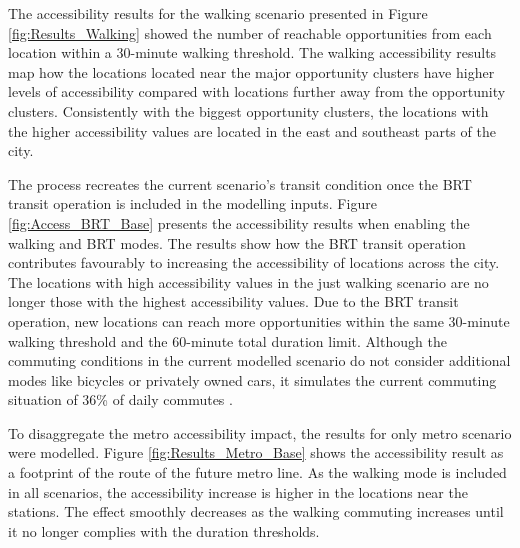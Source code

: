 \documentclass[12pt, a4paper]{report}
\begin{document}
The accessibility results for the walking scenario presented in Figure \ref{fig:Results_Walking} showed the number of reachable opportunities from each location within a 30-minute walking threshold. The walking accessibility results map how the locations located near the major opportunity clusters have higher levels of accessibility compared with locations further away from the opportunity clusters. Consistently with the biggest opportunity clusters, the locations with the higher accessibility values are located in the east and southeast parts of the city.

The process recreates the current scenario's transit condition once the BRT transit operation is included in the modelling inputs. Figure \ref{fig:Access_BRT_Base} presents the accessibility results when enabling the walking and BRT modes. The results show how the BRT transit operation contributes favourably to increasing the accessibility of locations across the city. The locations with high accessibility values in the just walking scenario are no longer those with the highest accessibility values. Due to the BRT transit operation, new locations can reach more opportunities within the same 30-minute walking threshold and the 60-minute total duration limit. Although the commuting conditions in the current modelled scenario do not consider additional modes like bicycles or privately owned cars, it simulates the current commuting situation of 36\% of daily commutes \citep{alcaldiadebogotad.c.EncuestaMovilidad20192019}.

To disaggregate the metro accessibility impact, the results for only metro scenario were modelled. Figure  \ref{fig:Results_Metro_Base} shows the accessibility result as a footprint of the route of the future metro line. As the walking mode is included in all scenarios, the accessibility increase is higher in the locations near the stations. The effect smoothly decreases as the walking commuting increases until it no longer complies with the duration thresholds.
\end{document}
